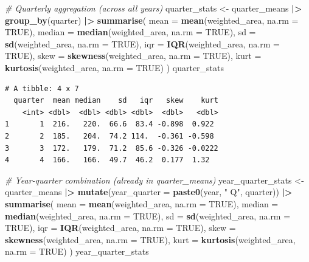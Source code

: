 \documentclass[
  british,
  10pt,
]{article}
\newenvironment{Shaded}{\begin{snugshade}}{\end{snugshade}}
\newcommand{\AttributeTok}[1]{\textcolor[rgb]{0.13,0.29,0.53}{#1}}
\newcommand{\CommentTok}[1]{\textcolor[rgb]{0.56,0.35,0.01}{\textit{#1}}}
\newcommand{\ConstantTok}[1]{\textcolor[rgb]{0.56,0.35,0.01}{#1}}
\newcommand{\FunctionTok}[1]{\textcolor[rgb]{0.13,0.29,0.53}{\textbf{#1}}}
\newcommand{\NormalTok}[1]{#1}
\newcommand{\OtherTok}[1]{\textcolor[rgb]{0.56,0.35,0.01}{#1}}
\newcommand{\SpecialCharTok}[1]{\textcolor[rgb]{0.81,0.36,0.00}{\textbf{#1}}}
\newcommand{\StringTok}[1]{\textcolor[rgb]{0.31,0.60,0.02}{#1}}
\begin{document}
\begin{Shaded}
\begin{Highlighting}[]
\CommentTok{\# Quarterly aggregation (across all years)}
\NormalTok{quarter\_stats }\OtherTok{\textless{}{-}}\NormalTok{ quarter\_means }\SpecialCharTok{|\textgreater{}} 
  \FunctionTok{group\_by}\NormalTok{(quarter) }\SpecialCharTok{|\textgreater{}} 
  \FunctionTok{summarise}\NormalTok{(}
    \AttributeTok{mean =} \FunctionTok{mean}\NormalTok{(weighted\_area, }\AttributeTok{na.rm =} \ConstantTok{TRUE}\NormalTok{),}
    \AttributeTok{median =} \FunctionTok{median}\NormalTok{(weighted\_area, }\AttributeTok{na.rm =} \ConstantTok{TRUE}\NormalTok{),}
    \AttributeTok{sd =} \FunctionTok{sd}\NormalTok{(weighted\_area, }\AttributeTok{na.rm =} \ConstantTok{TRUE}\NormalTok{),}
    \AttributeTok{iqr =} \FunctionTok{IQR}\NormalTok{(weighted\_area, }\AttributeTok{na.rm =} \ConstantTok{TRUE}\NormalTok{),}
    \AttributeTok{skew =} \FunctionTok{skewness}\NormalTok{(weighted\_area, }\AttributeTok{na.rm =} \ConstantTok{TRUE}\NormalTok{),}
    \AttributeTok{kurt =} \FunctionTok{kurtosis}\NormalTok{(weighted\_area, }\AttributeTok{na.rm =} \ConstantTok{TRUE}\NormalTok{)}
\NormalTok{  )}
\NormalTok{quarter\_stats}
\end{Highlighting}
\end{Shaded}

\begin{verbatim}
# A tibble: 4 x 7
  quarter  mean median    sd   iqr   skew    kurt
    <int> <dbl>  <dbl> <dbl> <dbl>  <dbl>   <dbl>
1       1  216.   220.  66.6  83.4 -0.898  0.922 
2       2  185.   204.  74.2 114.  -0.361 -0.598 
3       3  172.   179.  71.2  85.6 -0.326 -0.0222
4       4  166.   166.  49.7  46.2  0.177  1.32  
\end{verbatim}

\begin{Shaded}
\begin{Highlighting}[]
\CommentTok{\# Year{-}quarter combination (already in quarter\_means)}
\NormalTok{year\_quarter\_stats }\OtherTok{\textless{}{-}}\NormalTok{ quarter\_means }\SpecialCharTok{|\textgreater{}} 
  \FunctionTok{mutate}\NormalTok{(}\AttributeTok{year\_quarter =} \FunctionTok{paste0}\NormalTok{(year, }\StringTok{" Q"}\NormalTok{, quarter)) }\SpecialCharTok{|\textgreater{}} 
  \FunctionTok{summarise}\NormalTok{(}
    \AttributeTok{mean =} \FunctionTok{mean}\NormalTok{(weighted\_area, }\AttributeTok{na.rm =} \ConstantTok{TRUE}\NormalTok{),}
    \AttributeTok{median =} \FunctionTok{median}\NormalTok{(weighted\_area, }\AttributeTok{na.rm =} \ConstantTok{TRUE}\NormalTok{),}
    \AttributeTok{sd =} \FunctionTok{sd}\NormalTok{(weighted\_area, }\AttributeTok{na.rm =} \ConstantTok{TRUE}\NormalTok{),}
    \AttributeTok{iqr =} \FunctionTok{IQR}\NormalTok{(weighted\_area, }\AttributeTok{na.rm =} \ConstantTok{TRUE}\NormalTok{),}
    \AttributeTok{skew =} \FunctionTok{skewness}\NormalTok{(weighted\_area, }\AttributeTok{na.rm =} \ConstantTok{TRUE}\NormalTok{),}
    \AttributeTok{kurt =} \FunctionTok{kurtosis}\NormalTok{(weighted\_area, }\AttributeTok{na.rm =} \ConstantTok{TRUE}\NormalTok{)}
\NormalTok{  )}
\NormalTok{year\_quarter\_stats}
\end{Highlighting}
\end{Shaded}
\end{document}
